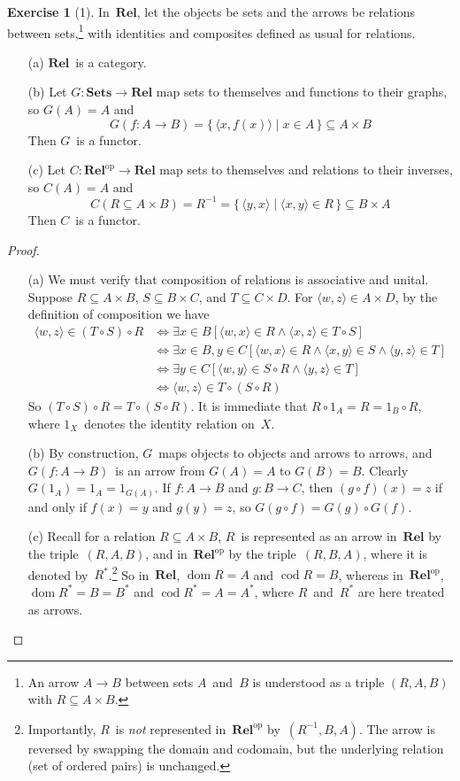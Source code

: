 \documentclass[letterpaper,12pt]{article}
\newcommand{\after}{\circ}
\DeclareMathOperator{\dom}{dom}
\DeclareMathOperator{\cod}{cod}
\newcommand{\pair}[2]{\langle{#1},{#2}\rangle}
\newcommand{\inv}[1]{#1^{-1}}
\renewcommand{\star}[1]{#1^{*}}
\newcommand{\cat}[1]{\mathbf{#1}}
\newcommand{\dual}[1]{#1^{\mathrm{op}}}
\newcommand{\Rel}{\cat{Rel}}
\newcommand{\Relop}{\dual{\Rel}}
\newcommand{\Sets}{\cat{Sets}}
\theoremstyle{definition}
\newtheorem*{exer}{Exercise}
\theoremstyle{remark}
\theoremstyle{direction}
\begin{document}
\begin{exer}[1]
In~\(\Rel\), let the objects be sets and the arrows be relations between sets,\footnote{An arrow \(A\to B\) between sets \(A\)~and~\(B\) is understood as a triple \((R,A,B)\) with \(R\subseteq A\times B\).} with identities and composites defined as usual for relations.
\begin{enumerate}[itemsep=0pt]
\item[(a)] \(\Rel\)~is a category.
\item[(b)] Let \(G:\Sets\to\Rel\) map sets to themselves and functions to their graphs, so \(G(A)=A\) and
\[G(f:A\to B)=\{\,\pair{x}{f(x)}\mid x\in A\,\}\subseteq A\times B\]
Then \(G\)~is a functor.
\item[(c)] Let \(C:\Relop\to\Rel\) map sets to themselves and relations to their inverses, so \(C(A)=A\) and
\[C(R\subseteq A\times B)=\inv{R}=\{\,\pair{y}{x}\mid\pair{x}{y}\in R\,\}\subseteq B\times A\]
Then \(C\)~is a functor.
\end{enumerate}
\begin{proof}\
\begin{enumerate}[itemsep=0pt]
\item[(a)] We must verify that composition of relations is associative and unital. Suppose \(R\subseteq A\times B\), \(S\subseteq B\times C\), and \(T\subseteq C\times D\). For \(\pair{w}{z}\in A\times D\), by the definition of composition we have
\begin{align*}
\pair{w}{z}\in(T\after S)\after R&\iff\exists x\in B[\pair{w}{x}\in R\land\pair{x}{z}\in T\after S]\\
								&\iff\exists x\in B,y\in C[\pair{w}{x}\in R\land\pair{x}{y}\in S\land\pair{y}{z}\in T]\\
								&\iff\exists y\in C[\pair{w}{y}\in S\after R\land\pair{y}{z}\in T]\\
								&\iff\pair{w}{z}\in T\after(S\after R)
\end{align*}
So \((T\after S)\after R=T\after(S\after R)\). It is immediate that \(R\after 1_A=R=1_B\after R\), where \(1_X\)~denotes the identity relation on~\(X\).
\item[(b)] By construction, \(G\)~maps objects to objects and arrows to arrows, and \(G(f:A\to B)\)~is an arrow from \(G(A)=A\) to \(G(B)=B\). Clearly \(G(1_A)=1_A=1_{G(A)}\). If \(f:A\to B\) and \(g:B\to C\), then \((g\after f)(x)=z\) if and only if \(f(x)=y\) and \(g(y)=z\), so \(G(g\after f)=G(g)\after G(f)\).
\item[(c)] Recall for a relation \(R\subseteq A\times B\), \(R\)~is represented as an arrow in~\(\Rel\) by the triple~\((R,A,B)\), and in~\(\Relop\) by the triple~\((R,B,A)\), where it is denoted by~\(\star{R}\).\footnote{Importantly, \(R\)~is \emph{not} represented in~\(\Relop\) by~\((\inv{R},B,A)\). The arrow is reversed by swapping the domain and codomain, but the underlying relation (set of ordered pairs) is unchanged.} So in~\(\Rel\), \(\dom R=A\) and \(\cod R=B\), whereas in~\(\Relop\), \(\dom\star{R}=B=\star{B}\) and \(\cod\star{R}=A=\star{A}\), where \(R\)~and~\(\star{R}\) are here treated as arrows.


\end{enumerate}
\end{proof}
\end{exer}
\end{document}
